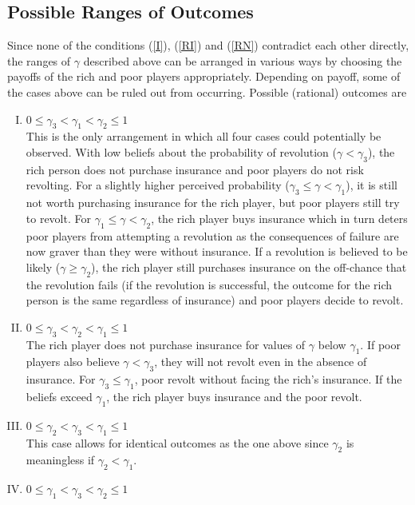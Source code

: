 \documentclass[12pt]{article}
\begin{document}
	\subsection{Possible Ranges of Outcomes}
	Since none of the conditions (\ref{I}), (\ref{RI}) and (\ref{RN}) 
	contradict each other directly, the ranges of $\gamma$ described above can 
	be arranged in various ways by choosing the payoffs of the rich and poor 
	players appropriately. Depending on payoff, some of the cases above can be 
	ruled out from occurring. Possible (rational) outcomes are
	\begin{enumerate}[I.]
		\item 	$0 \leq \gamma_3 < \gamma_1 < \gamma_2 \leq 1$\\
				This is the only arrangement in which all four cases could 
				potentially be observed. With low beliefs about the probability 
				of revolution ($\gamma<\gamma_3$), the rich person does not 
				purchase insurance and poor players do not risk revolting. For 
				a slightly higher perceived probability 
				($\gamma_3\leq\gamma<\gamma_1$), it is still not worth 
				purchasing insurance for the rich player, but poor players 
				still try to revolt. For $\gamma_1\leq\gamma<\gamma_2$, the 
				rich player buys insurance which in turn deters poor players 
				from attempting a revolution as the consequences of failure are 
				now graver than they were without insurance. If a revolution is 
				believed to be likely ($\gamma\geq\gamma_2$), the rich player 
				still purchases insurance on the off-chance that the revolution 
				fails (if the revolution is successful, the outcome for the 
				rich person is the same regardless of insurance) and poor 
				players decide to revolt.
		\item	$0 \leq \gamma_3 < \gamma_2 < \gamma_1 \leq 1$\\
				The rich player does not purchase insurance for values of 
				$\gamma$ below $\gamma_1$. If poor players also believe 
				$\gamma<\gamma_3$, they will not revolt even in the absence of 
				insurance. For $\gamma_3\leq\gamma_1$, poor revolt without 
				facing the rich's insurance. If the beliefs exceed $\gamma_1$, 
				the rich player buys insurance and the poor revolt.
		\item	$0 \leq \gamma_2 < \gamma_3 < \gamma_1 \leq 1$\\
				This case allows for identical outcomes as the one above since 
				$\gamma_2$ is meaningless if $\gamma_2<\gamma_1$.
		\item	$0 \leq \gamma_1 < \gamma_3 < \gamma_2 \leq 1$\\

\end{enumerate}
\end{document}
